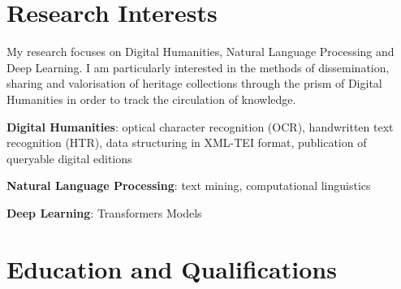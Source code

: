 \documentclass[11pt,a4paper]{moderncv}
\begin{document}
\vspace*{10pt}

\maketitle
\vspace*{-40pt}

\vspace{10pt}

\section{\textbf{Research Interests}}
My research focuses on Digital Humanities, Natural Language Processing and Deep Learning. I am particularly interested in the methods of dissemination, sharing and valorisation of heritage collections through the prism of Digital Humanities in order to track the circulation of knowledge.

\textbf{Digital Humanities}: optical character recognition (\textsc{OCR}), handwritten text recognition (\textsc{HTR}), data structuring in \textsc{XML-TEI} format, publication of queryable digital editions

\textbf{Natural Language Processing}: text mining, computational linguistics

\textbf{Deep Learning}: Transformers Models

\vspace*{4pt}
\section{\textbf{Education and Qualifications}}

%


\end{document}
